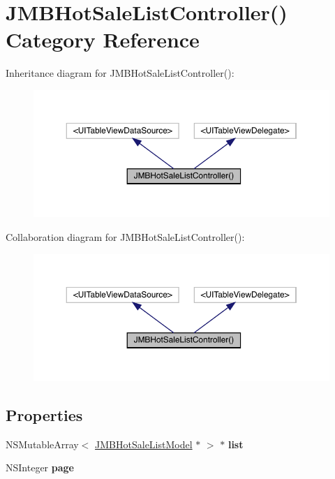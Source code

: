 \hypertarget{category_j_m_b_hot_sale_list_controller_07_08}{}\section{J\+M\+B\+Hot\+Sale\+List\+Controller() Category Reference}
\label{category_j_m_b_hot_sale_list_controller_07_08}


Inheritance diagram for J\+M\+B\+Hot\+Sale\+List\+Controller()\+:\nopagebreak
\begin{figure}[H]
\begin{center}
\leavevmode
\includegraphics[width=350pt]{category_j_m_b_hot_sale_list_controller_07_08__inherit__graph}
\end{center}
\end{figure}


Collaboration diagram for J\+M\+B\+Hot\+Sale\+List\+Controller()\+:\nopagebreak
\begin{figure}[H]
\begin{center}
\leavevmode
\includegraphics[width=350pt]{category_j_m_b_hot_sale_list_controller_07_08__coll__graph}
\end{center}
\end{figure}
\subsection*{Properties}
\begin{DoxyCompactItemize}
\item 
\mbox{\label{category_j_m_b_hot_sale_list_controller_07_08_adf0e61b62d5f5adc255ed284a52f5d9d}} 
N\+S\+Mutable\+Array$<$ \mbox{\hyperlink{interface_j_m_b_hot_sale_list_model}{J\+M\+B\+Hot\+Sale\+List\+Model}} $\ast$ $>$ $\ast$ {\bfseries list}
\item 
\mbox{\label{category_j_m_b_hot_sale_list_controller_07_08_a27825267490dc87f0d99cec9d5bb7281}} 
N\+S\+Integer {\bfseries page}
\end{DoxyCompactItemize}


